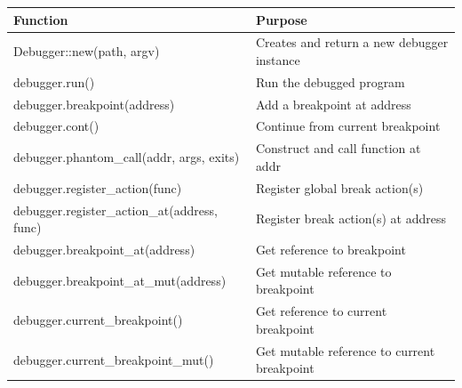 \documentclass{article}
\begin{document}
\begin{center}
    \begin{tabular}{|l|l|}
    \hline
    \bf Function & \bf Purpose \\ \hline
    Debugger::new(path, argv) & Creates and return a new debugger instance \\ \hline
    debugger.run() & Run the debugged program \\ \hline
    debugger.breakpoint(address) & Add a breakpoint at address \\ \hline
    debugger.cont() & Continue from current breakpoint \\ \hline
    debugger.phantom\_call(addr, args, exits) & Construct and call function at addr \\ \hline
    debugger.register\_action(func) & Register global break action(s) \\ \hline
    debugger.register\_action\_at(address, func) & Register break action(s) at address \\ \hline
    debugger.breakpoint\_at(address) & Get reference to breakpoint \\ \hline
    debugger.breakpoint\_at\_mut(address) & Get mutable reference to breakpoint \\ \hline
    debugger.current\_breakpoint() & Get reference to current breakpoint \\ \hline
    debugger.current\_breakpoint\_mut() & Get mutable reference to current breakpoint \\ \hline
    \end{tabular}
\end{center}
\end{document}
